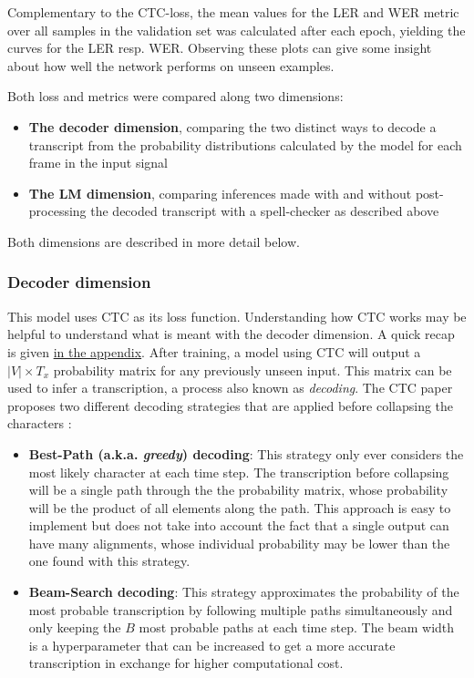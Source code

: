 Complementary to the \ac{CTC}-loss, the mean values for the \ac{LER} and \ac{WER} metric over all samples in the validation set was calculated after each epoch, yielding the curves for the \ac{LER} resp. \ac{WER}. Observing these plots can give some insight about how well the network performs on unseen examples.

Both loss and metrics were compared along two dimensions:

\begin{itemize}
	\item \textbf{The decoder dimension}, comparing the two distinct ways to decode a transcript from the probability distributions calculated by the model for each frame in the input signal
	\item \textbf{The LM dimension}, comparing inferences made with and without post-processing the decoded transcript with a spell-checker as described above
\end{itemize}

Both dimensions are described in more detail below.

\subsubsection{Decoder dimension}

This model uses \ac{CTC} as its loss function. Understanding how \ac{CTC} works may be helpful to understand what is meant with the decoder dimension. A quick recap is given \hyperref[ctc-summary]{in the appendix}. After training, a model using \ac{CTC} will output a $|V| \times T_x$ probability matrix for any previously unseen input. This matrix can be used to infer a transcription, a process also known as \textit{decoding}. The \ac{CTC} paper proposes two different decoding strategies that are applied before collapsing the characters \cite{ctc_paper}:

\begin{itemize}
	\item \textbf{Best-Path (a.k.a. \textit{greedy}) decoding}: This strategy only ever considers the most likely character at each time step. The transcription before collapsing will be a single path through the the probability matrix, whose probability will be the product of all elements along the path. This approach is easy to implement but does not take into account the fact that a single output can have many alignments, whose individual probability may be lower than the one found with this strategy.
	\item \textbf{Beam-Search decoding}: This strategy approximates the probability of the most probable transcription by following multiple paths simultaneously and only keeping the $B$ most probable paths at each time step. The beam width is a hyperparameter that can be increased to get a more accurate transcription in exchange for higher computational cost.
\end{itemize}

